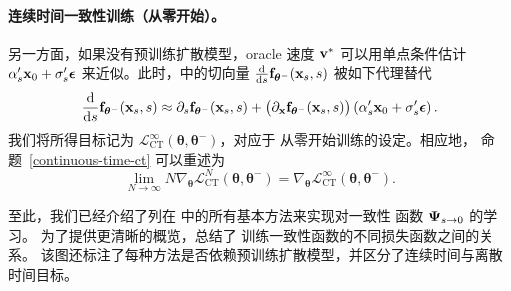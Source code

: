 \paragraph{连续时间一致性训练（从零开始）。} 另一方面，如果没有预训练扩散模型，oracle
速度 ${\mathbf{v}}^*$ 可以用单点条件估计
$\alpha_s'{\mathbf{x}}_0 + \sigma_s'{\bm{\epsilon}}$ 来近似。此时，中的切向量
$\tfrac{\mathop{}\!\mathrm{d}}{\mathop{}\!\mathrm{d} s}{\mathbf{f}}_{{\bm{\theta}}^-}({\mathbf{x}}_s,s)$ 被如下代理替代
\begin{align}\label{eq:ct-continuous-time}
    \frac{\mathop{}\!\mathrm{d}}{\mathop{}\!\mathrm{d} s}{\mathbf{f}}_{{\bm{\theta}}^-}({\mathbf{x}}_s,s)
     \approx
    \partial_s {\mathbf{f}}_{{\bm{\theta}}^-}({\mathbf{x}}_s,s)
    + \big(\partial_{{\mathbf{x}}}{\mathbf{f}}_{{\bm{\theta}}^-}({\mathbf{x}}_s,s)\big)
      \left(\alpha_s'{\mathbf{x}}_0 + \sigma_s'{\bm{\epsilon}}\right).
\end{align}
我们将所得目标记为
$\mathcal{L}^\infty_{\mathrm{CT}}(\bm{\theta},\bm{\theta}^-)$，对应于
从零开始训练的设定。相应地，
命题~\ref{continuous-time-ct} 可以重述为
\[
\lim_{N\to\infty}
N  \nabla_{\bm{\theta}}
\mathcal{L}_{\mathrm{CT}}^{N}(\bm{\theta},\bm{\theta}^-)
 =
\nabla_{\bm{\theta}}
\mathcal{L}_{\mathrm{CT}}^{\infty}(\bm{\theta},\bm{\theta}^-).
\]



至此，我们已经介绍了列在
中的所有基本方法来实现对一致性
函数 ${\bm{\Psi}}_{s\to 0}$ 的学习。
为了提供更清晰的概览，总结了
训练一致性函数的不同损失函数之间的关系。
该图还标注了每种方法是否依赖预训练扩散模型，并区分了连续时间与离散时间目标。




